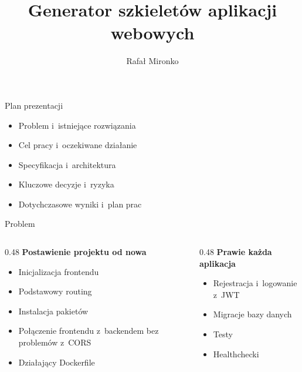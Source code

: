 \documentclass[aspectratio=169, 11pt]{beamer}
\title{Generator szkieletów aplikacji webowych}
\author{Rafał Mironko}
\institute{Informatyka, Inżynieria Oprogramowania\\[2mm] Opiekun: dr Szymon Kijas, IAiIS}
\date{}
\begin{document}
\begin{frame}
  \titlepage
\end{frame}

\begin{frame}{Plan prezentacji}
  \begin{itemize}
    \item Problem i~istniejące rozwiązania
    \item Cel pracy i~oczekiwane działanie
    \item Specyfikacja i~architektura
    \item Kluczowe decyzje i~ryzyka
    \item Dotychczasowe wyniki i~plan prac
  \end{itemize}
\end{frame}

\begin{frame}{Problem}
  \begin{columns}[T]
    \begin{column}{0.48\textwidth}
      \textbf{Postawienie projektu od nowa}
      \begin{itemize}
        \item Inicjalizacja frontendu
        \item Podstawowy routing
        \item Instalacja pakietów
        \item Połączenie frontendu z~backendem bez problemów z~CORS
        \item Działający Dockerfile
      \end{itemize}
    \end{column}
    \begin{column}{0.48\textwidth}
      \textbf{Prawie każda aplikacja}
      \begin{itemize}
        \item Rejestracja i~logowanie z~JWT
        \item Migracje bazy danych
        \item Testy
        \item Healthchecki
      \end{itemize}
    \end{column}
  \end{columns}
\end{frame}
\end{document}

